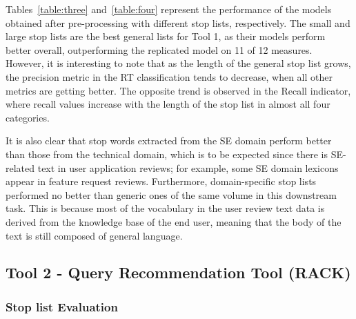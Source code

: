 \documentclass[conference]{IEEEtran}
\begin{document}
\begin{sloppy}
Tables~\ref{table:three} and~\ref{table:four} represent the performance of the models obtained after pre-processing with different stop lists, respectively. The small and large stop lists are the best general lists for Tool 1, as their models perform better overall, outperforming the replicated model on 11 of 12 measures. However, it is interesting to note that as the length of the general stop list grows, the precision metric in the RT classification tends to decrease, when all other metrics are getting better. The opposite trend is observed in the Recall indicator, where recall values increase with the length of the stop list in almost all four categories. 
 
It is also clear that stop words extracted from the SE domain perform better than those from the technical domain, which is to be expected since there is SE-related text in user application reviews; for example, some SE domain lexicons appear in feature request reviews. Furthermore, domain-specific stop lists performed no better than generic ones of the same volume in this downstream task. This is because most of the vocabulary in the user review text data is derived from the knowledge base of the end user, meaning that the body of the text is still composed of general language. 

\subsection{Tool 2 - Query Recommendation Tool (RACK)}

\subsubsection{Stop list Evaluation}


\end{sloppy}
\end{document}
